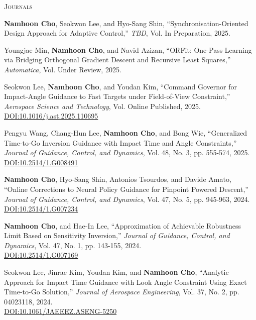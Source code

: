 \textsc{Journals}
\vspace{0.5em}
\begin{enumerate}[itemsep=0.5em, label={[}J\arabic*{]}]
\item \textbf{Namhoon Cho}, Seokwon Lee, and Hyo-Sang Shin, ``Synchronisation-Oriented Design Approach for Adaptive Control,'' \textit{TBD}, Vol. In Preparation, 2025. 

\item Youngjae Min, \textbf{Namhoon Cho}, and Navid Azizan, ``ORFit: One-Pass Learning via Bridging Orthogonal Gradient Descent and Recursive Least Squares,'' \textit{Automatica}, Vol. Under Review, 2025. 

\item Seokwon Lee, \textbf{Namhoon Cho}, and Youdan Kim, ``Command Governor for Impact-Angle Guidance to Fast Targets under Field-of-View Constraint,'' \textit{Aerospace Science and Technology}, Vol. Online Published, 2025. \\
\href{https://doi.org/10.1016/j.ast.2025.110695}{DOI:10.1016/j.ast.2025.110695}

\item Pengyu Wang, Chang-Hun Lee, \textbf{Namhoon Cho}, and Bong Wie, ``Generalized Time-to-Go Inversion Guidance with Impact Time and Angle Constraints,'' \textit{Journal of Guidance, Control, and Dynamics}, Vol. 48, No. 3, pp. 555-574, 2025. \\
\href{https://doi.org/10.2514/1.G008491}{DOI:10.2514/1.G008491}

\item \textbf{Namhoon Cho}, Hyo-Sang Shin, Antonios Tsourdos, and Davide Amato, ``Online Corrections to Neural Policy Guidance for Pinpoint Powered Descent,'' \textit{Journal of Guidance, Control, and Dynamics}, Vol. 47, No. 5, pp. 945-963, 2024. \\
\href{https://doi.org/10.2514/1.G007234}{DOI:10.2514/1.G007234}

\item \textbf{Namhoon Cho}, and Hae-In Lee, ``Approximation of Achievable Robustness Limit Based on Sensitivity Inversion,'' \textit{Journal of Guidance, Control, and Dynamics}, Vol. 47, No. 1, pp. 143-155, 2024. \\
\href{https://doi.org/10.2514/1.G007169}{DOI:10.2514/1.G007169}

\item Seokwon Lee, Jinrae Kim, Youdan Kim, and \textbf{Namhoon Cho}, ``Analytic Approach for Impact Time Guidance with Look Angle Constraint Using Exact Time-to-Go Solution,'' \textit{Journal of Aerospace Engineering}, Vol. 37, No. 2, pp. 04023118, 2024. \\
\href{https://doi.org/10.1061/JAEEEZ.ASENG-5250}{DOI:10.1061/JAEEEZ.ASENG-5250}


\end{enumerate}

